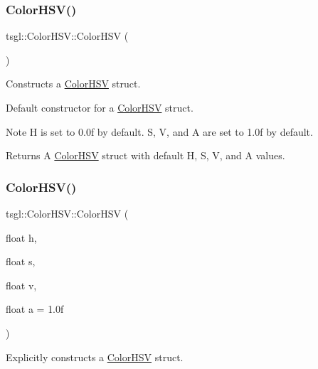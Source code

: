 \subsubsection{\texorpdfstring{Color\+H\+S\+V()}{ColorHSV()}\hspace{0.1cm}{\footnotesize\ttfamily [1/2]}}
{\footnotesize\ttfamily tsgl\+::\+Color\+H\+S\+V\+::\+Color\+H\+SV (\begin{DoxyParamCaption}{ }\end{DoxyParamCaption})}



Constructs a \hyperlink{structtsgl_1_1_color_h_s_v}{Color\+H\+SV} struct. 

Default constructor for a \hyperlink{structtsgl_1_1_color_h_s_v}{Color\+H\+SV} struct. \begin{DoxyNote}{Note}
H is set to 0.\+0f by default. S, V, and A are set to 1.\+0f by default. 
\end{DoxyNote}
\begin{DoxyReturn}{Returns}
A \hyperlink{structtsgl_1_1_color_h_s_v}{Color\+H\+SV} struct with default H, S, V, and A values. 
\end{DoxyReturn}
\mbox{\label{structtsgl_1_1_color_h_s_v_a9ff97b9a0434ab700883b24c3738645d}} 
\subsubsection{\texorpdfstring{Color\+H\+S\+V()}{ColorHSV()}\hspace{0.1cm}{\footnotesize\ttfamily [2/2]}}
{\footnotesize\ttfamily tsgl\+::\+Color\+H\+S\+V\+::\+Color\+H\+SV (\begin{DoxyParamCaption}\item[{float}]{h,  }\item[{float}]{s,  }\item[{float}]{v,  }\item[{float}]{a = {\ttfamily 1.0f} }\end{DoxyParamCaption})}



Explicitly constructs a \hyperlink{structtsgl_1_1_color_h_s_v}{Color\+H\+SV} struct. 

